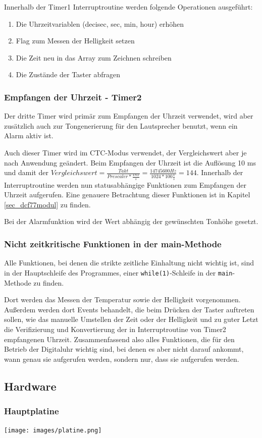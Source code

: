 Innerhalb der Timer1 Interruptroutine werden folgende Operationen ausgeführt:
\begin{enumerate}
  \item Die Uhrzeitvariablen (decisec, sec, min, hour) erhöhen
  \item Flag zum Messen der Helligkeit setzen
  \item Die Zeit neu in das Array zum Zeichnen schreiben
  \item Die Zustände der Taster abfragen
\end{enumerate}
 
\subsubsection{Empfangen der Uhrzeit - Timer2}
Der dritte Timer wird primär zum Empfangen der Uhrzeit verwendet, wird aber zusätzlich auch zur Tongenerierung für den Lautsprecher benutzt, wenn ein Alarm aktiv ist.

Auch dieser Timer wird im CTC-Modus verwendet, der Vergleichswert aber je nach Anwendung geändert. Beim Empfangen der Uhrzeit ist die Auflösung 10 ms und damit der $Vergleichswert = \frac{Takt}{Prescaler * \frac{INT}{s}} = \frac{14745600 Hz}{1024 * 100 \frac{1}{s}} = 144$. Innerhalb der Interruptroutine werden nun statusabhängige Funktionen zum Empfangen der Uhrzeit aufgerufen. Eine genauere Betrachtung dieser Funktionen ist in Kapitel \ref{sec_dcf77modul} zu finden.

Bei der Alarmfunktion wird der Wert abhängig der gewünschten Tonhöhe gesetzt.

\subsubsection{Nicht zeitkritische Funktionen in der main-Methode}
Alle Funktionen, bei denen die strikte zeitliche Einhaltung nicht wichtig ist, sind in der Hauptschleife des Programmes, einer \texttt{while(1)}-Schleife in der \texttt{main}-Methode zu finden.

Dort werden das Messen der Temperatur sowie der Helligkeit vorgenommen. Außerdem werden dort Events behandelt, die beim Drücken der Taster auftreten sollen, wie das manuelle Umstellen der Zeit oder der Helligkeit und zu guter Letzt die Verifizierung und Konvertierung der in Interruptroutine von Timer2 empfangenen Uhrzeit. Zusammenfassend also alles Funktionen, die für den Betrieb der Digitaluhr wichtig sind, bei denen es aber nicht darauf ankommt, wann genau sie aufgerufen werden, sondern nur, dass sie aufgerufen werden. 

\subsection{Hardware}
\subsubsection{Hauptplatine}
\centering
\texttt{[image: images/platine.png]}
\label{img_platine}

%
%
%
